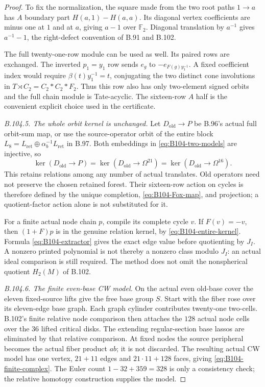 \begin{proof}
To fix the normalization, the square made from the two root paths
$1\to a$ has $A$ boundary part $H(a,1)-H(a,a)$. Its diagonal
vertex coefficients are minus one at $1$ and at $a$, giving
$a-1$ over $\mathbb F_2$. Diagonal translation by $a^{-1}$ gives
$a^{-1}-1$, the right-defect convention of B.91 and B.102.

The full twenty-one-row module can be used as well. Its paired
rows are exchanged. The inverted $p_1=y_1$ row sends
$e_g$ to $-e_{F(g)y_1^{-1}}$. A fixed coefficient index would
require $\beta(t)y_1^{-1}=t$, conjugating the two distinct cone
involutions in $T\rtimes C_2=C_2*C_2*F_2$.
Thus this row also has only two-element signed orbits and the
full chain module is Tate-acyclic. The sixteen-row $A$ half is
the convenient explicit choice used in the certificate.

\emph{B.104.5. The whole orbit kernel is unchanged.}
Let $D_{\mathrm{old}}\to P$ be B.96's actual full orbit-sum map,
or use the source-operator orbit of the entire block
$L_8=L_{\mathrm{ret}}\oplus\alpha_b^{-1}L_{\mathrm{ret}}$ in B.97.
Both embeddings in \eqref{eq:B104-two-models} are injective, so
\begin{equation}\label{eq:B104-entire-kernel}
 \ker(D_{\mathrm{old}}\to P)
  =\ker(D_{\mathrm{old}}\to\Omega^{21})
  =\ker(D_{\mathrm{old}}\to\Omega^{16}).
\end{equation}
This retains relations among any number of actual translates.
Old operators need not preserve the chosen retained forest.
Their sixteen-row action on cycles is therefore defined by the
unique completion, \eqref{eq:B104-Fox-map}, and projection;
a quotient-factor action alone is not substituted for it.

For a finite actual node chain $p$, compile its complete cycle $v$.
If $F(v)=-v$, then $(1+F)p$ is in the genuine relation kernel,
by \eqref{eq:B104-entire-kernel}. Formula
\eqref{eq:B104-extractor} gives the exact edge value before
quotienting by $J_I$. A nonzero printed polynomial is not thereby
a nonzero class modulo $J_I$: an actual ideal comparison is still
required. The method does not omit the nonspherical quotient
$H_2(M)$ of B.102.

\emph{B.104.6. The finite even-base CW model.}
On the actual even old-base cover the eleven fixed-source lifts
give the free base group $S$. Start with the fiber rose over its
eleven-edge base graph. Each graph cylinder contributes twenty-one
two-cells. B.102's finite relative node comparison then attaches
the $128$ actual node cells over the $36$ lifted critical disks.
The extending regular-section base lassos are eliminated by that
relative comparison. At fixed nodes the source peripheral becomes
the actual fiber product $ab$; it is not discarded. The resulting
actual CW model has one vertex, $21+11$ edges and
$21\cdot11+128$ faces, giving \eqref{eq:B104-finite-complex}.
The Euler count $1-32+359=328$ is only a consistency check;
the relative homotopy construction supplies the model.


\end{proof}
